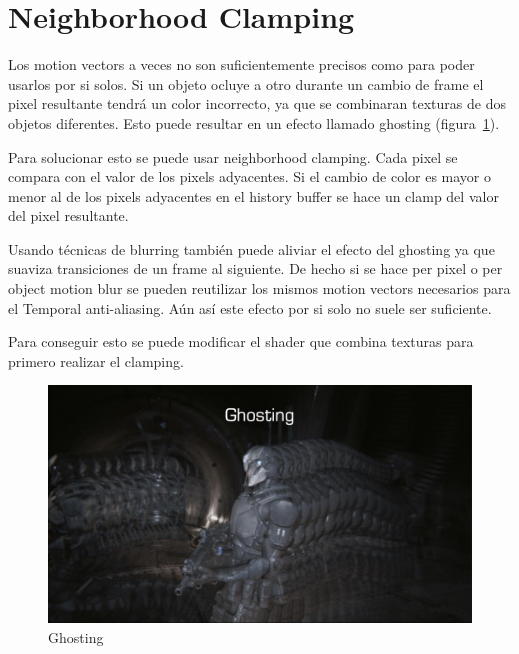 \documentclass[withindex, glossary]{cam-thesis}
\begin{document}
\section{Neighborhood Clamping}

Los motion vectors a veces no son suficientemente precisos como para poder usarlos por si solos. Si un objeto ocluye a otro durante un cambio de frame el pixel resultante tendrá un color incorrecto, ya que se combinaran texturas de dos objetos diferentes. Esto puede resultar en un efecto llamado ghosting (figura~\ref{ghosting}).

Para solucionar esto se puede usar neighborhood clamping. Cada pixel se compara con el valor de los pixels adyacentes. Si el cambio de color es mayor o menor al de los pixels adyacentes en el history buffer se hace un clamp del valor del pixel resultante.

Usando técnicas de blurring también puede aliviar el efecto del ghosting ya que suaviza transiciones de un frame al siguiente. De hecho si se hace per pixel o per object motion blur se pueden reutilizar los mismos motion vectors necesarios para el Temporal anti-aliasing. Aún así este efecto por si solo no suele ser suficiente.

Para conseguir esto se puede modificar el shader que combina texturas para primero realizar el clamping.

\begin{figure}[!htbp]
    \includegraphics[width=.8\linewidth]{figures/ghosting.png}
    \caption{Ghosting\cite{unrealtaa}\label{ghosting}}
\end{figure}
\end{document}
